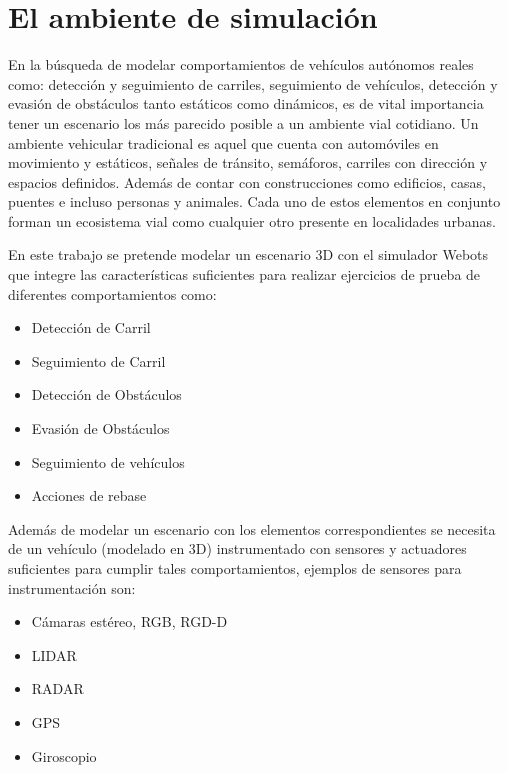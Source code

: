 \section{El ambiente de simulación} \label{sec:el_ambiente_de_simulación}

En la búsqueda de modelar comportamientos de vehículos autónomos reales como: detección y seguimiento de carriles, seguimiento de vehículos, detección y evasión de obstáculos tanto estáticos como dinámicos, es de vital importancia tener un escenario los más parecido posible a un ambiente vial cotidiano. Un ambiente vehicular tradicional es aquel que cuenta con automóviles en movimiento y estáticos, señales de tránsito, semáforos, carriles con dirección y espacios definidos. Además de contar con construcciones como edificios, casas, puentes e incluso personas y animales. Cada uno de estos elementos en conjunto forman un ecosistema vial como cualquier otro presente en localidades urbanas.

En este trabajo se pretende modelar un escenario 3D con el simulador Webots que integre las características suficientes para realizar ejercicios de prueba de diferentes comportamientos como:
\begin{itemize}
    \item Detección de Carril
    \item Seguimiento de Carril
    \item Detección de Obstáculos
    \item Evasión de Obstáculos
    \item Seguimiento de vehículos
    \item Acciones de rebase
\end{itemize}

Además de modelar un escenario con los elementos correspondientes se necesita de un vehículo (modelado en 3D) instrumentado con sensores y actuadores suficientes para cumplir tales comportamientos, ejemplos de sensores para instrumentación son:
\begin{itemize}
    \item Cámaras estéreo, RGB, RGD-D
    \item LIDAR
    \item RADAR
    \item GPS
    \item Giroscopio
\end{itemize}

